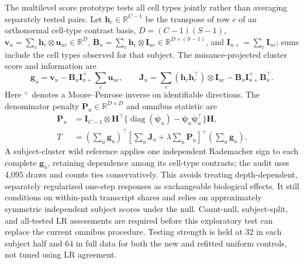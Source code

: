 \documentclass[11pt]{article}
\begin{document}
The multilevel score prototype tests all cell types jointly rather than averaging separately tested pairs. Let \(\mathbf h_c\in\mathbb R^{C-1}\) be the transpose of row \(c\) of an orthonormal cell-type contrast basis, \(D=(C-1)(S-1)\), \(\mathbf v_u=\sum_c\mathbf h_c\otimes\mathbf u_{uc}\in\mathbb R^D\), \(\mathbf B_u=\sum_c\mathbf h_c\otimes\mathbf I_{uc}\in\mathbb R^{D\times(S-1)}\), and \(\mathbf I_{u+}=\sum_c\mathbf I_{uc}\); sums include the cell types observed for that subject. The nuisance-projected cluster score and information are \begin{equation}\mathbf g_u=\mathbf v_u-\mathbf B_u\mathbf I_{u+}^{+}\sum_c\mathbf u_{uc},\qquad \mathbf J_u=\sum_c(\mathbf h_c\mathbf h_c^\top)\otimes\mathbf I_{uc}-\mathbf B_u\mathbf I_{u+}^{+}\mathbf B_u^\top.\end{equation} Here \(^{+}\) denotes a Moore--Penrose inverse on identifiable directions. The denominator penalty \(\mathbf P_u\in\mathbb R^{D\times D}\) and omnibus statistic are \begin{equation}\begin{aligned}\mathbf P_u&=\mathbf I_{C-1}\otimes\mathbf H^\top\{\operatorname{diag}(\boldsymbol\psi_u)-\boldsymbol\psi_u\boldsymbol\psi_u^\top\}\mathbf H,\\T&=\left(\sum_u\mathbf g_u\right)^\top\left[\sum_u\mathbf J_u+\lambda\sum_u\mathbf P_u\right]^{+}\left(\sum_u\mathbf g_u\right).\end{aligned}\end{equation} A subject-cluster wild reference applies one independent Rademacher sign to each complete \(\mathbf g_u\), retaining dependence among its cell-type contrasts; the audit uses 4,095 draws and counts ties conservatively. This avoids treating depth-dependent, separately regularized one-step responses as exchangeable biological effects. It still conditions on within-path transcript shares and relies on approximately symmetric independent subject scores under the null. Count-null, subject-split, and all-tested LR assessments are required before this exploratory test can replace the current omnibus procedure. Testing strength is held at 32 in each subject half and 64 in full data for both the new and refitted uniform controls, not tuned using LR agreement.
\end{document}
